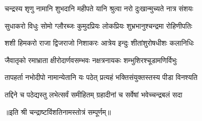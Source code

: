 

\twolineshloka
{चन्द्रस्य शृणु नामानि शुभदानि महीपते}
{यानि श्रुत्वा नरो दुःखान्मुच्यते नात्र संशयः}

\twolineshloka
{सुधाकरो विधुः सोमो ग्लौरब्जः कुमुदप्रियः}
{लोकप्रियः शुभ्रभानुश्चन्द्रमा रोहिणीपतिः}

\twolineshloka
{शशी हिमकरो राजा द्विजराजो निशाकरः}
{आत्रेय इन्दुः शीतांशुरोषधीशः कलानिधिः}

\twolineshloka
{जैवातृको रमाभ्राता क्षीरोदार्णवसम्भवः}
{नक्षत्रनायकः शम्भुशिरश्चूडामणिर्विभुः}

\twolineshloka
{तापहर्ता नभोदीपो नामान्येतानि यः पठेत्}
{प्रत्यहं भक्तिसंयुक्तस्तस्य पीडा विनश्यति}

\twolineshloka
{तद्दिने च पठेद्यस्तु लभेत्सर्वं समीहितम्}
{ग्रहादीनां च सर्वेषां भवेच्चन्द्रबलं सदा}


॥इति श्री चन्द्राष्टविंशतिनामस्तोत्रं सम्पूर्णम्॥